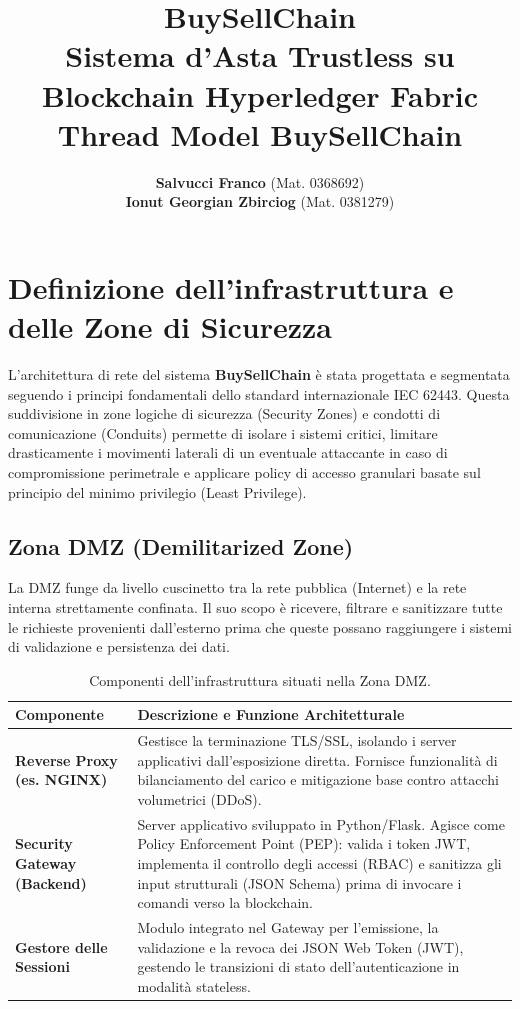 \documentclass[12pt,a4paper]{article}
\title{
    \vspace{2cm}
    {\Huge\bfseries BuySellChain}\\
    \vspace{0.5cm}
    {\Large Sistema d'Asta Trustless su Blockchain Hyperledger Fabric}\\
    \vspace{1cm}
    {\small Thread Model BuySellChain }
}
\author{
    \textbf{Salvucci Franco} (Mat. 0368692) \\
    \textbf{Ionut Georgian Zbirciog} (Mat. 0381279)
}
\begin{document}
\maketitle

\tableofcontents

\newpage

\section{Definizione dell'infrastruttura e delle Zone di Sicurezza}
L'architettura di rete del sistema \textbf{BuySellChain} è stata progettata e segmentata seguendo i principi fondamentali dello standard internazionale IEC 62443. Questa suddivisione in zone logiche di sicurezza (Security Zones) e condotti di comunicazione (Conduits) permette di isolare i sistemi critici, limitare drasticamente i movimenti laterali di un eventuale attaccante in caso di compromissione perimetrale e applicare policy di accesso granulari basate sul principio del minimo privilegio (Least Privilege).

\subsection{Zona DMZ (Demilitarized Zone)}
La DMZ funge da livello cuscinetto tra la rete pubblica (Internet) e la rete interna strettamente confinata. Il suo scopo è ricevere, filtrare e sanitizzare tutte le richieste provenienti dall'esterno prima che queste possano raggiungere i sistemi di validazione e persistenza dei dati.

\begin{table}[h]
\centering
\small
\renewcommand{\arraystretch}{1.4}
\begin{tabularx}{\textwidth}{>{\hsize=0.3\hsize\bfseries}X >{\hsize=0.7\hsize}X}
\toprule
Componente & Descrizione e Funzione Architetturale \\
\midrule
Reverse Proxy (es. NGINX) & Gestisce la terminazione TLS/SSL, isolando i server applicativi dall'esposizione diretta. Fornisce funzionalità di bilanciamento del carico e mitigazione base contro attacchi volumetrici (DDoS). \\
Security Gateway (Backend) & Server applicativo sviluppato in Python/Flask. Agisce come Policy Enforcement Point (PEP): valida i token JWT, implementa il controllo degli accessi (RBAC) e sanitizza gli input strutturali (JSON Schema) prima di invocare i comandi verso la blockchain. \\
Gestore delle Sessioni & Modulo integrato nel Gateway per l'emissione, la validazione e la revoca dei JSON Web Token (JWT), gestendo le transizioni di stato dell'autenticazione in modalità stateless. \\
\bottomrule
\end{tabularx}
\caption{Componenti dell'infrastruttura situati nella Zona DMZ.}
\end{table}
\end{document}
